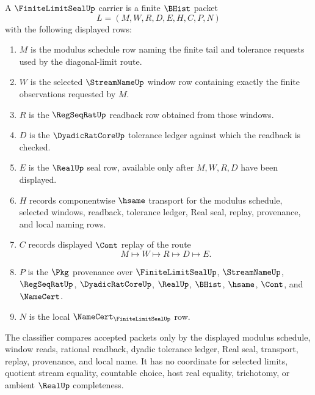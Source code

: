 \begin{definition}
\label{def:finite-limit-seal-carrier}
A $\FiniteLimitSealUp$ carrier is a finite $\BHist$ packet
$$
L=(M,W,R,D,E,H,C,P,N)
$$
with the following displayed rows:
\begin{enumerate}
\item $M$ is the modulus schedule row naming the finite tail and tolerance requests used by the diagonal-limit route.
\item $W$ is the selected $\StreamNameUp$ window row containing exactly the finite observations requested by $M$.
\item $R$ is the $\RegSeqRatUp$ readback row obtained from those windows.
\item $D$ is the $\DyadicRatCoreUp$ tolerance ledger against which the readback is checked.
\item $E$ is the $\RealUp$ seal row, available only after $M,W,R,D$ have been displayed.
\item $H$ records componentwise $\hsame$ transport for the modulus schedule, selected windows, readback, tolerance ledger, Real seal, replay, provenance, and local naming rows.
\item $C$ records displayed $\Cont$ replay of the route
$$
M \longmapsto W \longmapsto R \longmapsto D \longmapsto E .
$$
\item $P$ is the $\Pkg$ provenance over $\FiniteLimitSealUp$, $\StreamNameUp$, $\RegSeqRatUp$, $\DyadicRatCoreUp$, $\RealUp$, $\BHist$, $\hsame$, $\Cont$, and $\NameCert$.
\item $N$ is the local $\NameCert_{\FiniteLimitSealUp}$ row.
\end{enumerate}
The classifier compares accepted packets only by the displayed modulus schedule, window reads, rational readback, dyadic tolerance ledger, Real seal, transport, replay, provenance, and local name. It has no coordinate for selected limits, quotient stream equality, countable choice, host real equality, trichotomy, or ambient $\RealUp$ completeness.
\end{definition}

